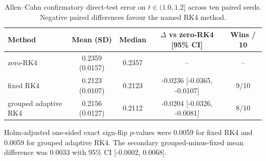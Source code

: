 \begin{table}[t]
\centering
\caption{Allen--Cahn confirmatory direct-test error on $t\in(1.0,1.2]$ across ten paired seeds. Negative paired differences favour the named RK4 method.}
\label{tab:allen_cahn_confirmatory}
\small
\begin{tabular}{lcccc}
\toprule
Method & Mean (SD) & Median & $\Delta$ vs zero-RK4 [95\% CI] & Wins / 10 \\
\midrule
zero-RK4 & 0.2359 (0.0157) & 0.2357 & -- & -- \\
fixed RK4 & 0.2123 (0.0107) & 0.2123 & -0.0236 [-0.0365, -0.0107] & 9/10 \\
grouped adaptive RK4 & 0.2156 (0.0127) & 0.2112 & -0.0204 [-0.0326, -0.0081] & 8/10 \\
\bottomrule
\end{tabular}
\vspace{2pt}
\begin{minipage}{0.96\linewidth}\footnotesize
Holm-adjusted one-sided exact sign-flip $p$-values were 0.0059 for fixed RK4 and 0.0059 for grouped adaptive RK4. The secondary grouped-minus-fixed mean difference was 0.0033 with 95\% CI [-0.0002, 0.0068].
\end{minipage}
\end{table}
